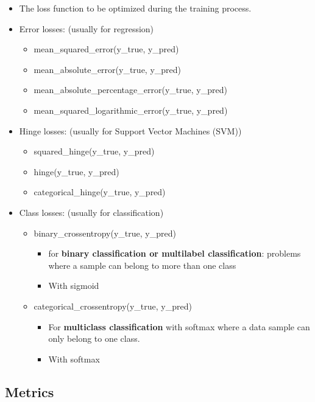 \documentclass{article}
\begin{document}
\begin{itemize}
    \item The loss function to be optimized during the training process.
    \item Error losses: (usually for regression)
    \begin{itemize}
        \item mean\_squared\_error(y\_true, y\_pred)
        \item mean\_absolute\_error(y\_true, y\_pred)
        \item mean\_absolute\_percentage\_error(y\_true, y\_pred)
        \item mean\_squared\_logarithmic\_error(y\_true, y\_pred)
    \end{itemize}
    \item Hinge losses: (usually for Support Vector Machines (SVM))
    \begin{itemize}
        \item squared\_hinge(y\_true, y\_pred)
        \item hinge(y\_true, y\_pred)
        \item categorical\_hinge(y\_true, y\_pred)
    \end{itemize}
    \item Class losses: (usually for classification)
    \begin{itemize}
        \item binary\_crossentropy(y\_true, y\_pred)
        \begin{itemize}
            \item for \textbf{binary classification or multilabel classification}: problems where a sample can belong to more than one class
            \item With sigmoid
        \end{itemize}
        \item categorical\_crossentropy(y\_true, y\_pred)
        \begin{itemize}
            \item For \textbf{multiclass classification} with softmax where a data sample can only belong to one class.
            \item With softmax
        \end{itemize}
    \end{itemize}
\end{itemize}

\subsection{Metrics}
\end{document}
